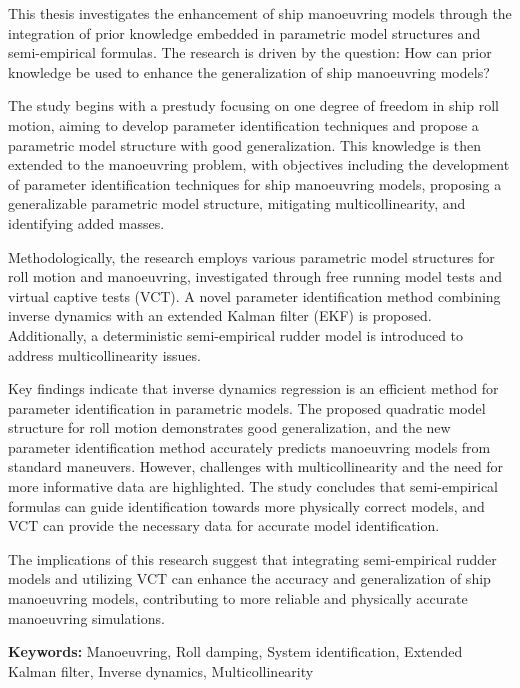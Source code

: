 This thesis investigates the enhancement of ship manoeuvring models through the integration of prior knowledge embedded in parametric model structures and semi-empirical formulas. The research is driven by the question: How can prior knowledge be used to enhance the generalization of ship manoeuvring models?

The study begins with a prestudy focusing on one degree of freedom in ship roll motion, aiming to develop parameter identification techniques and propose a parametric model structure with good generalization. This knowledge is then extended to the manoeuvring problem, with objectives including the development of parameter identification techniques for ship manoeuvring models, proposing a generalizable parametric model structure, mitigating multicollinearity, and identifying added masses.

Methodologically, the research employs various parametric model structures for roll motion and manoeuvring, investigated through free running model tests and virtual captive tests (VCT). A novel parameter identification method combining inverse dynamics with an extended Kalman filter (EKF) is proposed. Additionally, a deterministic semi-empirical rudder model is introduced to address multicollinearity issues.

Key findings indicate that inverse dynamics regression is an efficient method for parameter identification in parametric models. The proposed quadratic model structure for roll motion demonstrates good generalization, and the new parameter identification method accurately predicts manoeuvring models from standard maneuvers. However, challenges with multicollinearity and the need for more informative data are highlighted. The study concludes that semi-empirical formulas can guide identification towards more physically correct models, and VCT can provide the necessary data for accurate model identification.

The implications of this research suggest that integrating semi-empirical rudder models and utilizing VCT can enhance the accuracy and generalization of ship manoeuvring models, contributing to more reliable and physically accurate manoeuvring simulations.


\vspace{0.3cm}
\noindent\textbf{Keywords:} Manoeuvring, Roll damping, System identification, Extended Kalman filter, Inverse dynamics, Multicollinearity
\cleardoublepage
